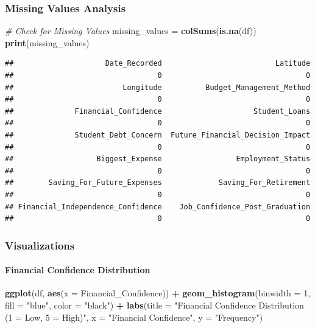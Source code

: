 \documentclass[
]{article}
\newenvironment{Shaded}{\begin{snugshade}}{\end{snugshade}}
\newcommand{\AttributeTok}[1]{\textcolor[rgb]{0.13,0.29,0.53}{#1}}
\newcommand{\CommentTok}[1]{\textcolor[rgb]{0.56,0.35,0.01}{\textit{#1}}}
\newcommand{\DecValTok}[1]{\textcolor[rgb]{0.00,0.00,0.81}{#1}}
\newcommand{\FunctionTok}[1]{\textcolor[rgb]{0.13,0.29,0.53}{\textbf{#1}}}
\newcommand{\NormalTok}[1]{#1}
\newcommand{\OtherTok}[1]{\textcolor[rgb]{0.56,0.35,0.01}{#1}}
\newcommand{\SpecialCharTok}[1]{\textcolor[rgb]{0.81,0.36,0.00}{\textbf{#1}}}
\newcommand{\StringTok}[1]{\textcolor[rgb]{0.31,0.60,0.02}{#1}}
\begin{document}
\subsubsection{Missing Values Analysis}\label{missing-values-analysis}

\begin{Shaded}
\begin{Highlighting}[]
\CommentTok{\# Check for Missing Values}
\NormalTok{missing\_values }\OtherTok{=} \FunctionTok{colSums}\NormalTok{(}\FunctionTok{is.na}\NormalTok{(df))}
\FunctionTok{print}\NormalTok{(missing\_values)}
\end{Highlighting}
\end{Shaded}

\begin{verbatim}
##                     Date_Recorded                          Latitude 
##                                 0                                 0 
##                         Longitude          Budget_Management_Method 
##                                 0                                 0 
##              Financial_Confidence                     Student_Loans 
##                                 0                                 0 
##              Student_Debt_Concern  Future_Financial_Decision_Impact 
##                                 0                                 0 
##                   Biggest_Expense                 Employment_Status 
##                                 0                                 0 
##        Saving_For_Future_Expenses             Saving_For_Retirement 
##                                 0                                 0 
## Financial_Independence_Confidence    Job_Confidence_Post_Graduation 
##                                 0                                 0
\end{verbatim}

\subsubsection{Visualizations}\label{visualizations}

\paragraph{Financial Confidence
Distribution}\label{financial-confidence-distribution}

\begin{Shaded}
\begin{Highlighting}[]
\FunctionTok{ggplot}\NormalTok{(df, }\FunctionTok{aes}\NormalTok{(}\AttributeTok{x =}\NormalTok{ Financial\_Confidence)) }\SpecialCharTok{+}
  \FunctionTok{geom\_histogram}\NormalTok{(}\AttributeTok{binwidth =} \DecValTok{1}\NormalTok{, }\AttributeTok{fill =} \StringTok{"blue"}\NormalTok{, }\AttributeTok{color =} \StringTok{"black"}\NormalTok{) }\SpecialCharTok{+}
  \FunctionTok{labs}\NormalTok{(}\AttributeTok{title =} \StringTok{"Financial Confidence Distribution (1 = Low, 5 = High)"}\NormalTok{, }\AttributeTok{x =} \StringTok{"Financial Confidence"}\NormalTok{, }\AttributeTok{y =} \StringTok{"Frequency"}\NormalTok{)}
\end{Highlighting}
\end{Shaded}
\end{document}
